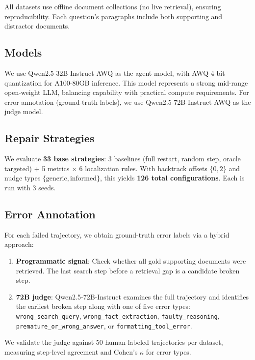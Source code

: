 \documentclass[letterpaper]{article}
\begin{document}
All datasets use offline document collections (no live retrieval), ensuring reproducibility. Each question's paragraphs include both supporting and distractor documents.

\subsection{Models}

We use Qwen2.5-32B-Instruct-AWQ as the agent model, with AWQ 4-bit quantization for A100-80GB inference. This model represents a strong mid-range open-weight LLM, balancing capability with practical compute requirements. For error annotation (ground-truth labels), we use Qwen2.5-72B-Instruct-AWQ as the judge model.

\subsection{Repair Strategies}

We evaluate \textbf{33 base strategies}: 3 baselines (full restart, random step, oracle targeted) + 5 metrics $\times$ 6 localization rules. With backtrack offsets $\{0, 2\}$ and nudge types $\{\text{generic}, \text{informed}\}$, this yields \textbf{126 total configurations}. Each is run with 3 seeds.

\subsection{Error Annotation}

For each failed trajectory, we obtain ground-truth error labels via a hybrid approach:

\begin{enumerate}
  \item \textbf{Programmatic signal}: Check whether all gold supporting documents were retrieved. The last search step before a retrieval gap is a candidate broken step.
  \item \textbf{72B judge}: Qwen2.5-72B-Instruct examines the full trajectory and identifies the earliest broken step along with one of five error types: \texttt{wrong\_search\_query}, \texttt{wrong\_fact\_extraction}, \texttt{faulty\_reasoning}, \texttt{premature\_or\_wrong\_answer}, or \texttt{formatting\_tool\_error}.
\end{enumerate}

We validate the judge against 50 human-labeled trajectories per dataset, measuring step-level agreement and Cohen's $\kappa$ for error types.
\end{document}
